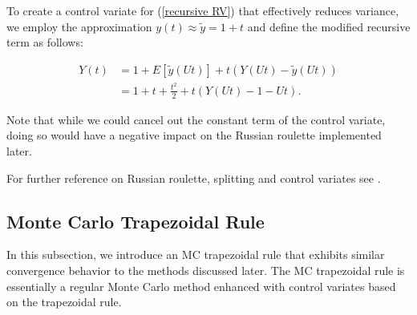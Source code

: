 \documentclass[a4paper,12pt]{article}
\begin{document}
\begin{example} \label{ex:CV}
    To create a control variate for (\ref{recursive RV}) that
    effectively reduces variance, we employ the approximation
    $y(t) \approx \tilde{y} =1+t$ and define the modified recursive term as follows:

    \begin{align}
        Y(t) & = 1 + E[\tilde{y}(Ut)] + t(Y(Ut) - \tilde{y}(Ut)) \\
             & = 1 + t + \frac{t^2}{2} + t(Y(Ut) - 1 - Ut).
    \end{align}

    Note that while we could cancel out the constant term
    of the control variate, doing so would have a negative impact
    on the Russian roulette implemented later.
\end{example}

\vspace*{0.2cm}
\begin{pythonn}
\end{pythonn}

\begin{related}[MC modification]
    For further reference on Russian roulette, splitting and control variates
    see \cite{veach_robust_1997}.
\end{related}

\subsection{Monte Carlo Trapezoidal Rule}

In this subsection, we introduce an MC trapezoidal rule that
exhibits similar convergence behavior to the methods discussed later.
The MC trapezoidal rule is essentially a regular Monte Carlo method
enhanced with control variates based on the trapezoidal rule.
\end{document}
